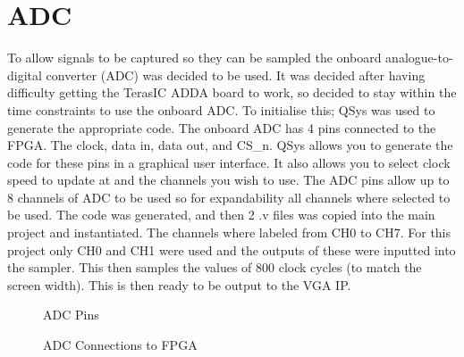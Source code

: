 \documentclass[a4paper,12pt]{article}
\begin{document}
\section{ADC}
\begin{flushleft}
To allow signals to be captured so they can be sampled the onboard analogue-to-digital converter (ADC) was decided to be used. It was decided after having difficulty getting the TerasIC ADDA board to work, so decided to stay within the time constraints to use the onboard ADC. To initialise this; QSys was used to generate the appropriate code. The onboard ADC has 4 pins connected to the FPGA. The clock, data in, data out, and CS\_n. QSys allows you to generate the code for these pins in a graphical user interface. It also allows you to select clock speed to update at and the channels you wish to use. The ADC pins allow up to 8 channels of ADC to be used so for expandability all channels where selected to be used. The code was generated, and then 2 .v files was copied into the main project and instantiated. The channels where labeled from CH0 to CH7. For this project only CH0 and CH1 were used and the outputs of these were inputted into the sampler. This then samples the values of 800 clock cycles (to match the screen width). This is then ready to be output to the VGA IP.
\begin{figure}[H]
	\centering
	\caption{ADC Pins \cite{terasic_2014}}
\end{figure}

\begin{figure}[H]
	\centering
	\caption{ADC Connections to FPGA \cite{terasic_2014}}
\end{figure}
\end{flushleft}
\newpage
\end{document}
